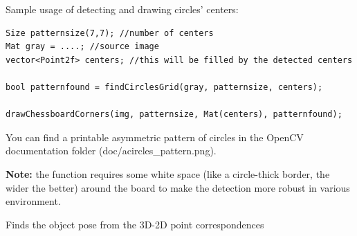 Sample usage of detecting and drawing circles' centers:
\begin{lstlisting}
Size patternsize(7,7); //number of centers
Mat gray = ....; //source image
vector<Point2f> centers; //this will be filled by the detected centers

bool patternfound = findCirclesGrid(gray, patternsize, centers);
    
drawChessboardCorners(img, patternsize, Mat(centers), patternfound);
\end{lstlisting}

You can find a printable asymmetric pattern of circles in the OpenCV
documentation folder (doc/acircles_pattern.png).

\textbf{Note:} the function requires some white space (like a circle-thick
border, the wider the better) around the board to make the detection more robust in various environment.
\fi

\ifCPy
{}
\else
{}
\fi
Finds the object pose from the 3D-2D point correspondences

